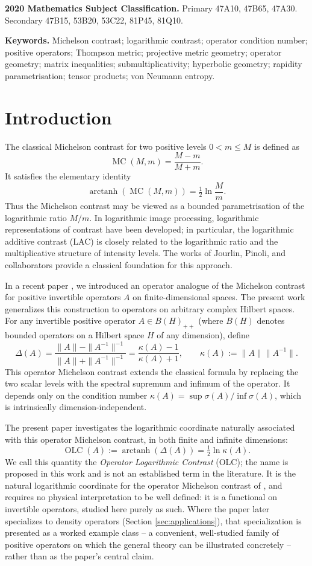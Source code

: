 \documentclass{article}
\theoremstyle{remark}
\providecommand{\QLC}{\operatorname{OLC}}
\providecommand{\MC}{\operatorname{MC}}
\begin{document}
\noindent\textbf{2020 Mathematics Subject Classification.} Primary 47A10, 47B65, 47A30. Secondary 47B15, 53B20, 53C22, 81P45, 81Q10.

\noindent\textbf{Keywords.} Michelson contrast; logarithmic contrast; operator condition number; positive operators; Thompson metric; projective metric geometry; operator geometry; matrix inequalities; submultiplicativity; hyperbolic geometry; rapidity parametrisation; tensor products; von Neumann entropy.


\section{Introduction}

The classical Michelson contrast for two positive levels $0<m\le M$ is defined as
\[
\MC(M,m) = \frac{M-m}{M+m}.
\]
It satisfies the elementary identity
\[
\operatorname{arctanh}(\MC(M,m)) = \tfrac12\ln\frac{M}{m}.
\]
Thus the Michelson contrast may be viewed as a bounded parametrisation of the logarithmic ratio $M/m$. In logarithmic image processing, logarithmic representations of contrast have been developed; in particular, the logarithmic additive contrast (LAC) is closely related to the logarithmic ratio and the multiplicative structure of intensity levels. The works of Jourlin, Pinoli, and collaborators \cite{jourlin1988,jourlin1989} provide a classical foundation for this approach.

In a recent paper \cite{abed2024}, we introduced an operator analogue of the Michelson contrast for positive invertible operators $A$ on finite-dimensional spaces. The present work generalizes this construction to operators on arbitrary complex Hilbert spaces. For any invertible positive operator $A\in B(H)_{++}$ (where $B(H)$ denotes bounded operators on a Hilbert space $H$ of any dimension), define
\[
\Delta(A) = \frac{\|A\|-\|A^{-1}\|^{-1}}{\|A\|+\|A^{-1}\|^{-1}} = \frac{\kappa(A)-1}{\kappa(A)+1}, \qquad \kappa(A):=\|A\|\|A^{-1}\|.
\]
This operator Michelson contrast extends the classical formula by replacing the two scalar levels with the spectral supremum and infimum of the operator. It depends only on the condition number $\kappa(A)=\sup\sigma(A)/\inf\sigma(A)$, which is intrinsically dimension-independent.

The present paper investigates the logarithmic coordinate naturally associated with this operator Michelson contrast, in both finite and infinite dimensions:
\[
\QLC(A) := \operatorname{arctanh}(\Delta(A)) = \tfrac12\ln\kappa(A).
\]
We call this quantity the \emph{Operator Logarithmic Contrast} (OLC); the name is proposed in this work and is not an established term in the literature. It is the natural logarithmic coordinate for the operator Michelson contrast of \cite{abed2024}, and requires no physical interpretation to be well defined: it is a functional on invertible operators, studied here purely as such. Where the paper later specializes to density operators (Section \ref{sec:applications}), that specialization is presented as a worked example class -- a convenient, well-studied family of positive operators on which the general theory can be illustrated concretely -- rather than as the paper's central claim.
\end{document}
